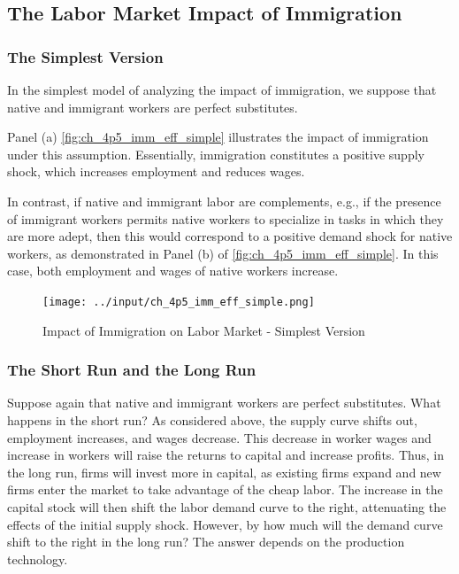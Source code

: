\subsection{The Labor Market Impact of Immigration}

\subsubsection{The Simplest Version}

In the simplest model of analyzing the 
impact of immigration, we suppose that 
native and immigrant workers are perfect substitutes.

Panel (a) \autoref{fig:ch_4p5_imm_eff_simple} 
illustrates the impact of immigration 
under this assumption. Essentially,
immigration constitutes a positive 
supply shock, which increases employment 
and reduces wages.

In contrast, if native and immigrant labor 
are complements, e.g., if the presence of 
immigrant workers permits native workers 
to specialize in tasks in which they are more adept,
then this would correspond to a positive demand shock for native workers, 
as demonstrated in Panel (b) of \autoref{fig:ch_4p5_imm_eff_simple}.
In this case, both employment and wages
of native workers increase.


\FloatBarrier

\begin{figure}[!htb]
    \centering
        \texttt{[image: ../input/ch\_4p5\_imm\_eff\_simple.png]}
    \caption{Impact of Immigration on Labor Market - Simplest Version}
    \label{fig:ch_4p5_imm_eff_simple}
\end{figure}

\FloatBarrier

\subsubsection{The Short Run and the Long Run}

Suppose again that native and immigrant workers 
are perfect substitutes. What happens in the short run? 
As considered above, the supply curve shifts out,
employment increases, and wages decrease.
This decrease in worker wages and increase in workers
will raise the returns to capital and increase profits. 
Thus, in the long run, firms will invest more in capital,
as existing firms expand and new firms enter the market 
to take advantage of the cheap labor.
The increase in the capital stock 
will then 
shift the labor demand curve to the right, attenuating the 
effects of the initial supply shock.
However, by how much will the demand curve shift to the right 
in the long run?
The answer depends on the production technology.

